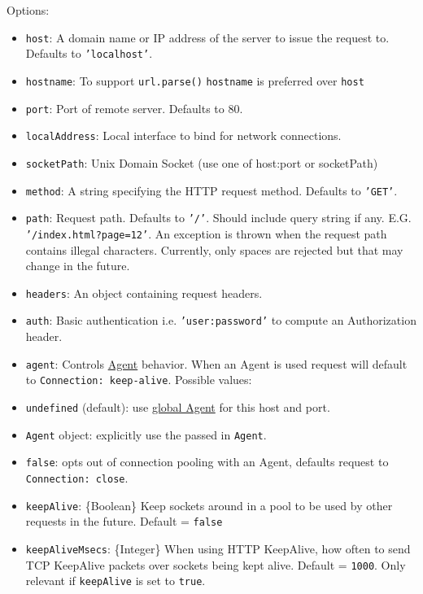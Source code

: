 Options:

\begin{itemize}
\itemsep1pt\parskip0pt
\item
  \texttt{host}: A domain name or IP address of the server to issue the
  request to. Defaults to \texttt{'localhost'}.
\item
  \texttt{hostname}: To support \texttt{url.parse()} \texttt{hostname}
  is preferred over \texttt{host}
\item
  \texttt{port}: Port of remote server. Defaults to 80.
\item
  \texttt{localAddress}: Local interface to bind for network
  connections.
\item
  \texttt{socketPath}: Unix Domain Socket (use one of host:port or
  socketPath)
\item
  \texttt{method}: A string specifying the HTTP request method. Defaults
  to \texttt{'GET'}.
\item
  \texttt{path}: Request path. Defaults to \texttt{'/'}. Should include
  query string if any. E.G. \texttt{'/index.html?page=12'}. An exception
  is thrown when the request path contains illegal characters.
  Currently, only spaces are rejected but that may change in the future.
\item
  \texttt{headers}: An object containing request headers.
\item
  \texttt{auth}: Basic authentication i.e. \texttt{'user:password'} to
  compute an Authorization header.
\item
  \texttt{agent}: Controls
  \hyperref[httpux5fclassux5fhttpux5fagent]{Agent} behavior. When an
  Agent is used request will default to \texttt{Connection: keep-alive}.
  Possible values:
\item
  \texttt{undefined} (default): use
  \hyperref[httpux5fhttpux5fglobalagent]{global Agent} for this host and
  port.
\item
  \texttt{Agent} object: explicitly use the passed in \texttt{Agent}.
\item
  \texttt{false}: opts out of connection pooling with an Agent, defaults
  request to \texttt{Connection: close}.
\item
  \texttt{keepAlive}: \{Boolean\} Keep sockets around in a pool to be
  used by other requests in the future. Default = \texttt{false}
\item
  \texttt{keepAliveMsecs}: \{Integer\} When using HTTP KeepAlive, how
  often to send TCP KeepAlive packets over sockets being kept alive.
  Default = \texttt{1000}. Only relevant if \texttt{keepAlive} is set to
  \texttt{true}.
\end{itemize}

